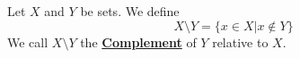 \newcommand{\SetComplement}[0]{\textbf{\hyperref[def:SetComplement]{Complement}}\xspace}
\newcommand{\SetComplements}[0]{\textbf{\hyperref[def:SetComplement]{Complements}}\xspace}
\begin{df}
\label{def:SetComplement}

\rm
    Let $X$ and $Y$ be sets. 
    We define 
    \begin{equation*}
        X \setminus Y= \{x \in X | x \not \in Y\}
    \end{equation*}
    We call $X \setminus Y$ the 
    \SetComplement of $Y$ relative to $X$. 
\end{df}
